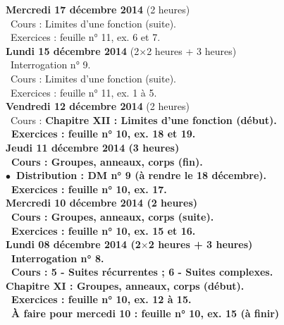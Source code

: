 \documentclass[12pt,a4paper]{article}
\begin{document}
\noindent\textbf{\bf Mercredi 17 décembre 2014 \rm} (2 heures)\\
\bu\ Cours : Limites d'une fonction (suite).\\
\bu\ Exercices : feuille n° 11, ex. 6 et 7.\vspace{.4cm}\\

\noindent\textbf{ Lundi 15 décembre 2014 \rm} (2$\times$2 heures + 3 heures)\\
\bu\ Interrogation n° 9.\\
\bu\ Cours : Limites d'une fonction (suite).\\
\bu\ Exercices : feuille n° 11, ex. 1 à 5.\vspace{.4cm}\\

\noindent\textbf{ \bf Vendredi 12 décembre 2014 \rm}(2 heures)\\
\bu\ Cours : 
\bf Chapitre XII \rm : Limites d'une fonction (début).\\
\bu\ Exercices : feuille n° 10, ex. 18 et 19.\vspace{.4cm}\\

\noindent\textbf{ \bf Jeudi 11 décembre 2014 \rm}(3 heures)\\
\bu\ Cours : Groupes, anneaux, corps (fin).\\
$\bullet$\ Distribution : DM n° 9 (à rendre le 18 décembre).\\
\bu\ Exercices : feuille n° 10, ex. 17.\vspace{.4cm}\\

\noindent\textbf{\bf Mercredi 10 décembre 2014 \rm} (2 heures)\\
\bu\ Cours : Groupes, anneaux, corps (suite).\\
\bu\ Exercices : feuille n° 10, ex. 15 et 16.\vspace{.4cm}\\

\noindent\textbf{ Lundi 08 décembre 2014 \rm} (2$\times$2 heures + 3 heures)\\
\bu\ Interrogation n° 8.\\
\bu\ Cours : 5 - Suites récurrentes ; 6 - Suites complexes.\\
\bf Chapitre XI \rm : Groupes, anneaux, corps (début).\\
\bu\ Exercices : feuille n° 10, ex. 12 à 15.\\
\bu\ À faire pour mercedi 10 : feuille n° 10, ex. 15 (à finir)\vspace{.4cm}\\
\end{document}
